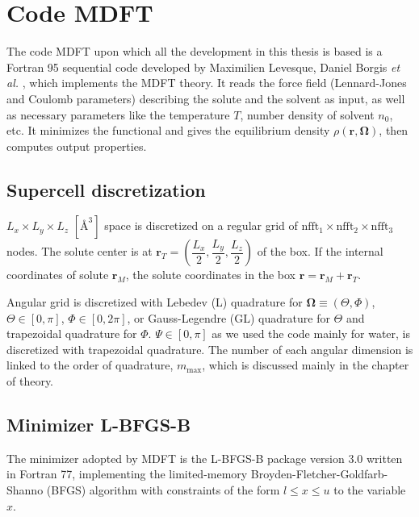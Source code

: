 
\chapter{Code MDFT\label{chpt:mdft}}

The code MDFT upon which all the development in this thesis is
based is a Fortran 95 sequential code developed by Maximilien Levesque,
Daniel Borgis \textit{et al.} \citep{gendre_classical_2009,jeanmairet_molecular_2013-1,jeanmairet_molecular_2015,jeanmairet_molecular_2016,Jeanmairet_thesis,levesque_solvation_2012,ramirez_density_2002,ramirez_density_2005,sergiievskyi_fast_2014,Zhao_2011},
which implements the \acs{MDFT} theory. It reads the force field (Lennard-Jones
and Coulomb parameters) describing the solute and the solvent as input,
as well as necessary parameters like the temperature $T$, number
density of solvent $n_{0}$, etc. It minimizes the functional and
gives the equilibrium density $\rho(\mathbf{r},\mathbf{\Omega})$,
then computes output properties.

\section{Supercell discretization}

$L_{x}\times L_{y}\times L_{z}$ $\left[\textrm{Å}^{3}\right]$ space
is discretized on a regular grid of $\textrm{nfft}_{1}\times\textrm{nfft}_{2}\times\textrm{nfft}_{3}$
nodes. The solute center is at $\mathbf{r}_{T}=\left(\dfrac{L_{x}}{2},\dfrac{L_{y}}{2},\dfrac{L_{z}}{2}\right)$
of the box. If the internal coordinates of solute $\mathbf{r}_{M}$,
the solute coordinates in the box $\mathbf{r}=\mathbf{r}_{M}+\mathbf{r}_{T}$.

Angular grid is discretized with Lebedev (L) quadrature for $\mathbf{\Omega}\equiv\left(\Theta,\Phi\right)$,
$\Theta\in\left[0,\pi\right]$, $\Phi\in\left[0,2\pi\right]$, or
Gauss-Legendre (GL) quadrature for $\Theta$ and trapezoidal quadrature
for $\Phi$. $\Psi\in\left[0,\pi\right]$ as we used the code mainly
for water, is discretized with trapezoidal quadrature. The number
of each angular dimension is linked to the order of quadrature, $m_{\max}$,
which is discussed mainly in the chapter of theory.

\section{Minimizer L-BFGS-B}

The minimizer adopted by \acs{MDFT} is the L-BFGS-B \citep{Zhu_1994_bfgs,Zhu_bfgs_1997_algorithm}
package version 3.0 written in Fortran 77, implementing the limited-memory
Broyden-Fletcher-Goldfarb-Shanno (BFGS) algorithm with constraints
of the form $l\leq x\leq u$ to the variable $x$.

